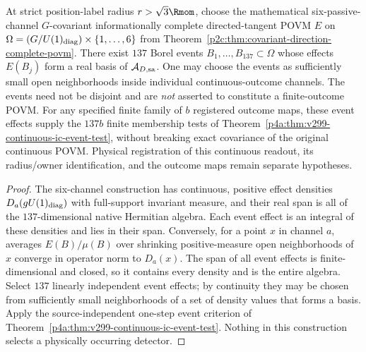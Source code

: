 \documentclass[12pt,a4paper]{article}
\begin{document}
\begin{corollary}
\label{p2c:cor:v299-directed-tangent-137-event-basis}
At strict position-label radius $r>\sqrt3\Rmom$, choose the
mathematical six-passive-channel $G$-covariant informationally
complete directed-tangent POVM $E$ on
$\Omega=(G/U(1)_{\rm diag})\times\{1,\ldots,6\}$ from
Theorem~\ref{p2c:thm:covariant-direction-complete-povm}.
There exist $137$ Borel events $B_1,\ldots,B_{137}\subset\Omega$ whose
effects $E(B_j)$ form a real basis of $\mathcal A_{D,\rm sa}$.
One may choose the events as sufficiently small open neighborhoods
inside individual continuous-outcome channels. The events need not
be disjoint and are \emph{not} asserted to constitute a finite-outcome
POVM. For any specified finite family of $b$ registered outcome maps,
these event effects supply the $137b$ finite membership tests of
Theorem~\ref{p4a:thm:v299-continuous-ic-event-test}, without
breaking exact covariance of the original continuous POVM.
Physical registration of this continuous readout, its radius/owner
identification, and the outcome maps remain separate hypotheses.
\end{corollary}
\begin{proof}
The six-channel construction has continuous, positive effect
densities $D_a(gU(1)_{\rm diag})$ with full-support invariant measure,
and their real span is all of the $137$-dimensional native Hermitian
algebra. Each event effect is an integral of these densities and
lies in their span. Conversely, for a point $x$ in channel $a$,
averages $E(B)/\mu(B)$ over shrinking positive-measure open
neighborhoods of $x$ converge in operator norm to $D_a(x)$.
The span of all event effects is finite-dimensional and closed, so
it contains every density and is the entire algebra. Select $137$
linearly independent event effects; by continuity they may be
chosen from sufficiently small neighborhoods of a set of density
values that forms a basis. Apply the source-independent one-step
event criterion of Theorem~\ref{p4a:thm:v299-continuous-ic-event-test}.
Nothing in this construction selects a physically occurring detector.
\end{proof}
\end{document}
